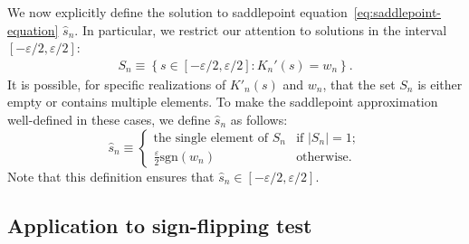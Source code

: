 \documentclass[12pt]{article}
\theoremstyle{definition}
\begin{document}
We now explicitly define the solution to saddlepoint equation~\eqref{eq:saddlepoint-equation} $\hat s_n$. In particular, we restrict our attention to solutions in the interval $[-\varepsilon/2, \varepsilon/2]$:
\begin{align*}
S_n\equiv \left\{s\in [-\varepsilon/2,\varepsilon/2]:K_n'(s)=w_n\right\}.
\end{align*}
It is possible, for specific realizations of $K'_n(s)$ and $w_n$, that the set $S_n$ is either empty or contains multiple elements. To make the saddlepoint approximation well-defined in these cases, we define $\hat s_n$ as follows:
\begin{equation}\label{eq:def_s_n}
\hat s_n \equiv 
\begin{cases}
\text{the single element of }S_n & \text{if } |S_n|=1; \\
\frac{\varepsilon}{2}\mathrm{sgn}(w_n) & \text{otherwise}.
\end{cases}
\end{equation}
Note that this definition ensures that $\hat s_n \in [-\varepsilon/2, \varepsilon/2]$.



\subsection{Application to sign-flipping test}\label{sec:sign-flipping}
\end{document}
